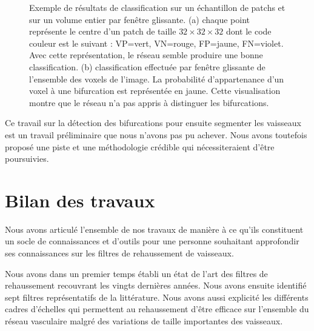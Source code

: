 \begin{figure}[!ht]
    \captionsetup[subfigure]{justification=centering}
    \centering
    \begin{subfigure}{0.48\textwidth}
        \caption{}
    \end{subfigure}
    \begin{subfigure}{0.48\textwidth}
    \caption{}
    \end{subfigure}
    \caption{Exemple de résultats de classification sur un échantillon de patchs et sur un volume entier par fenêtre glissante. (a) chaque point représente le centre d'un patch de taille $32 \times 32 \times 32$ dont le code couleur est le suivant : VP=vert, VN=rouge, FP=jaune, FN=violet. Avec cette représentation, le réseau semble produire une bonne classification. (b) classification effectuée par fenêtre glissante de l'ensemble des voxels de l'image. La probabilité d'appartenance d'un voxel à une bifurcation est représentée en jaune. Cette visualisation montre que le réseau n'a pas appris à distinguer les bifurcations.}
    \label{fig:inference_patches_vs_sliding_window}
\end{figure}

Ce travail sur la détection des bifurcations pour ensuite segmenter les vaisseaux est un travail préliminaire que nous n'avons pas pu achever. Nous avons toutefois proposé une piste et une méthodologie crédible qui nécessiteraient d'être poursuivies.

\section{ Bilan des travaux}

Nous avons articulé l'ensemble de nos travaux de manière à ce qu'ils constituent un socle de connaissances et d'outils pour une personne souhaitant approfondir ses connaissances sur les filtres de rehaussement de vaisseaux. 

Nous avons dans un premier temps établi un état de l'art des filtres de rehaussement recouvrant les vingts dernières années. Nous avons ensuite identifié sept filtres représentatifs de la littérature. Nous avons aussi explicité les différents cadres d'échelles qui permettent au rehaussement d'être efficace sur l'ensemble du réseau vasculaire malgré des variations de taille importantes des vaisseaux.

